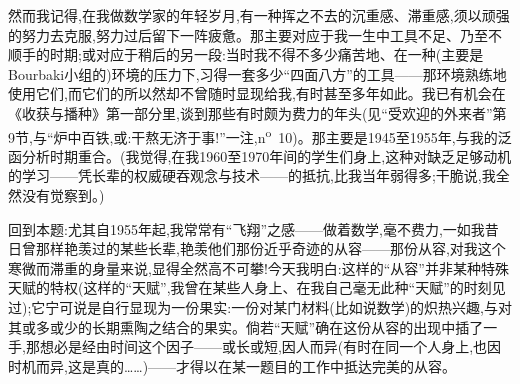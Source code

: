 然而我记得,在我做数学家的年轻岁月,有一种挥之不去的沉重感、滞重感,须以顽强的努力去克服,努力过后留下一阵疲惫。那主要对应于我一生中工具不足、乃至不顺手的时期;或对应于稍后的另一段:当时我不得不多少痛苦地、在一种(主要是Bourbaki小组的)环境的压力下,习得一套多少“四面八方”的工具——那环境熟练地使用它们,而它们的所以然却不曾随时显现给我,有时甚至多年如此。我已有机会在《收获与播种》第一部分里,谈到那些有时颇为费力的年头(见“受欢迎的外来者”第9节,与“炉中百铁,或:干熬无济于事!”一注,n\textsuperscript{o}~10)。那主要是1945至1955年,与我的泛函分析时期重合\dmark{}。(我觉得,在我1960至1970年间的学生们身上,这种对缺乏足够动机的学习——凭长辈的权威硬吞观念与技术——的抵抗,比我当年弱得多;干脆说,我全然没有觉察到。)

回到本题:尤其自1955年起,我常常有“飞翔”之感——做着数学,毫不费力,一如我昔日曾那样艳羡过的某些长辈,艳羡他们那份近乎奇迹的从容——那份从容,对我这个寒微而滞重的身量来说,显得全然高不可攀!今天我明白:这样的“从容”并非某种特殊天赋的特权(这样的“天赋”,我曾在某些人身上、在我自己毫无此种“天赋”的时刻见过);它宁可说是自行显现为一份果实:一份对某门材料(比如说数学)的炽热兴趣,与对其或多或少的长期熏陶之结合的果实。倘若“天赋”确在这份从容的出现中插了一手,那想必是经由时间这个因子——或长或短,因人而异(有时在同一个人身上,也因时机而异,这是真的……)——才得以在某一题目的工作中抵达完美的从容。

